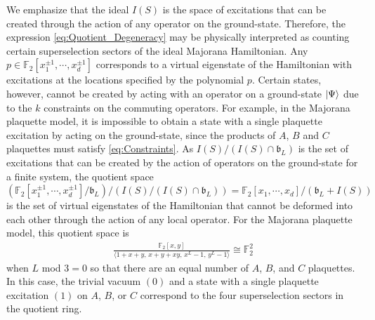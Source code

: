 \documentclass[aps,twocolumn,preprintnumbers,floatfix,showpacs,prx]{revtex4-1}
\begin{document}
We emphasize that the ideal $I(S)$ is the space of excitations
that can be created through the action of any operator on the ground-state.
Therefore, the expression \eqref{eq:Quotient_Degeneracy}
may be physically interpreted as counting certain superselection sectors of the ideal Majorana Hamiltonian. 
Any $p\in\mathbb{F}_{2}[x_1^{\pm1},\cdots,x_d^{\pm1}]$
corresponds to a virtual %
eigenstate of the Hamiltonian with excitations at the locations specified by the polynomial $p$.
Certain states, however, cannot be created by acting with an operator on a ground-state $\ket{\Psi}$
due to the $k$ constraints on the commuting operators.
For example, in the Majorana plaquette model,
it is impossible to obtain a state with a single plaquette excitation by acting on the ground-state,
since the products of $A$, $B$ and $C$ plaquettes must satisfy \eqref{eq:Constraints}.
As $I(S) / (I(S) \cap \mathfrak{b}_{L})$ is the set of excitations
that can be created by the action of operators on the ground-state for a finite system,
the quotient space 
$\left( \mathbb{F}_2[x_1^{\pm1},\cdots, x_d^{\pm1}]/\mathfrak b_L \right)/ \left( I(S)/(I(S)\cap\mathfrak{b}_{L}) \right)
= \mathbb{F}_2[x_1,\cdots, x_d] / \left( \mathfrak b_L + I(S) \right)$
is the set of virtual %
eigenstates of the Hamiltonian that cannot be deformed
into each other through the action of any local operator. %
For the Majorana plaquette model, this quotient space is 
\begin{align}
\frac{\mathbb{F}_{2}[x,y]}{\langle 1 + x + y,\,x + y + xy,\,x^{L} - 1,\,y^{L}-1\rangle} \cong \mathbb F_2^2
\end{align}
when $L$ mod $3 = 0$ so that there are an equal number of $A$, $B$, and $C$ plaquettes.
In this case, the trivial vacuum $(0)$ and a state with a single plaquette excitation $(1)$ on $A$, $B$, or $C$
correspond to the four superselection sectors in the quotient ring.
\end{document}
